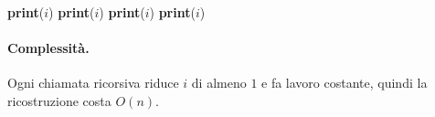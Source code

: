 \begin{algorithm}[ht]
\caption{Ricostruzione della soluzione}
\begin{algorithmic}[1]
    \State \Return
      \State \textbf{print}($i$)
      \State \Return
    \Else
        \State \textbf{print}($i$)
        \State \Return
      \Else
        \State {}
      \EndIf
    \EndIf
  \Else
        \State {}
        \State \textbf{print}($i$)
      \Else
        \State {}
      \EndIf
    \Else
          \State {}
          \State \textbf{print}($i$)
        \Else
          \State {}
        \EndIf
      \Else
        \State {}
      \EndIf
    \EndIf
  \EndIf
\EndProcedure
\end{algorithmic}
\end{algorithm}

\paragraph{Complessità.} Ogni chiamata ricorsiva riduce $i$ di almeno $1$ e fa
lavoro costante, quindi la ricostruzione costa $O(n)$.
